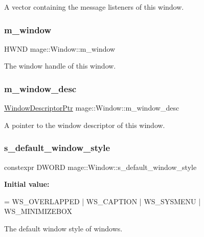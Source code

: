 A vector containing the message listeners of this window. \mbox{\label{classmage_1_1_window_a5ca72a18801ff9e6abc309949d7b08b4}} 
\subsubsection{\texorpdfstring{m\+\_\+window}{m\_window}}
{\footnotesize\ttfamily H\+W\+ND mage\+::\+Window\+::m\+\_\+window\hspace{0.3cm}{\ttfamily [private]}}

The window handle of this window. \mbox{\label{classmage_1_1_window_a51bbea46f4590a68d384d0b8d14e0cd8}} 
\subsubsection{\texorpdfstring{m\+\_\+window\+\_\+desc}{m\_window\_desc}}
{\footnotesize\ttfamily \mbox{\hyperlink{classmage_1_1_window_ac41b052d8e8dd0571b3ec862e8f6da05}{Window\+Descriptor\+Ptr}} mage\+::\+Window\+::m\+\_\+window\+\_\+desc\hspace{0.3cm}{\ttfamily [private]}}

A pointer to the window descriptor of this window. \mbox{\label{classmage_1_1_window_ac680bdd3d5359f66b2dea082ef45e0da}} 
\subsubsection{\texorpdfstring{s\+\_\+default\+\_\+window\+\_\+style}{s\_default\_window\_style}}
{\footnotesize\ttfamily constexpr D\+W\+O\+RD mage\+::\+Window\+::s\+\_\+default\+\_\+window\+\_\+style\hspace{0.3cm}{\ttfamily [static]}}

{\bfseries Initial value\+:}
\begin{DoxyCode}
= WS\_OVERLAPPED 
                                                      | WS\_CAPTION 
                                                      | WS\_SYSMENU 
                                                      | WS\_MINIMIZEBOX
\end{DoxyCode}
The default window style of windows. 